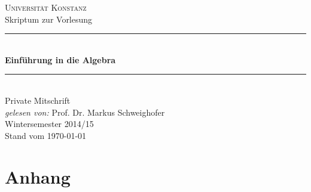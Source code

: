 \documentclass[11pt, a4paper, titlepage]{scrbook}
\newcommand{\HRule}{\rule{\linewidth}{0.5mm}}
\begin{document}
\begin{titlepage}
	\begin{center}
		\textsc{\LARGE Universität Konstanz}\\[1.5cm]
		{\large Skriptum zur Vorlesung}\\[0.5cm]
		\HRule \\[0.4cm]
		{\huge \bfseries Einführung in die Algebra \\[0.4cm]}
		\HRule \\[.5cm]
		{\small Private Mitschrift}\\[1.5cm]
		{\large \emph{gelesen von:} \hfill Prof. Dr. Markus Schweighofer}\\
		\large\vfill
		{\large Wintersemester 2014/15}\\
		{\large Stand vom \today}	
	\end{center}
\end{titlepage}

\setcounter{tocdepth}{1}
\tableofcontents



\chapter*{Anhang}
\printindex
\end{document}
